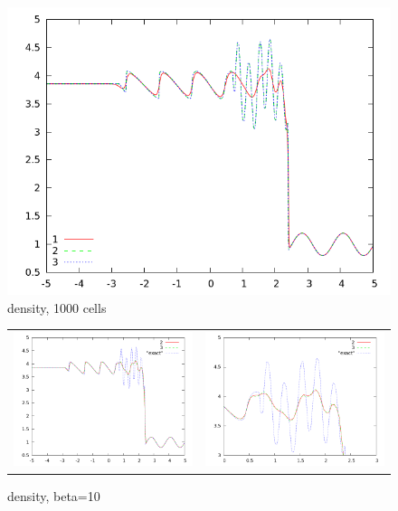 \documentclass[letterpaper,12pt]{article}
\begin{document}
\begin{figure}[h]
  \begin{center}
     \includegraphics[width=.78\textwidth]{1000.png}	
  \end{center}
  \caption{density, 1000 cells}
\end{figure}

\begin{figure}
  \begin{center}
	\begin{tabular}{cc}
      \includegraphics[width=.425\textwidth]{10.png} &
	  \includegraphics[width=.425\textwidth]{10zoom.png}
	\end{tabular}
  \end{center}
  \caption{density, beta=10}
  \label{fig:pvcellcomp}
\end{figure}
\end{document}
